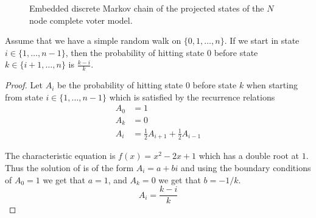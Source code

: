\begin{figure}[H]
  \centering
{}
\caption{Embedded discrete Markov chain of the projected states of the $N$ node complete voter model.}
  \label{fig:rw_voter_model_discrete}
\end{figure}

\begin{lemma}\label{lem:rw_hit_zero}
Assume that we have a simple random walk on $\{0,1,\ldots, n\}$.
If we start in state $i \in \{1,\ldots, n - 1\}$, then the probability of hitting state 0 before state $k \in \{i + 1, \ldots, n\}$ is $\frac{k - i}{k}$.
\end{lemma}

\begin{proof}
Let $A_i$ be the probability of hitting state 0 before state $k$ when starting from state $i \in \{1,\ldots, n - 1\}$ which is satisfied by the recurrence relations
\begin{align*}
    A_0 &= 1\\
    A_{k} &= 0\\
    A_i &= \frac{1}{2} A_{i + 1} + \frac{1}{2} A_{i - 1}
\end{align*}

The characteristic equation is $f(x) = x^2 - 2x + 1$ which has a double root at $1$.
Thus the solution of is of the form $A_i = a + bi$ and using the boundary conditions of $A_0 = 1$ we get that $a = 1$, and $A_{k} = 0$ we get that $b = - 1/k$.
$$
A_i = \frac{k - i}{k}
$$
\end{proof}

